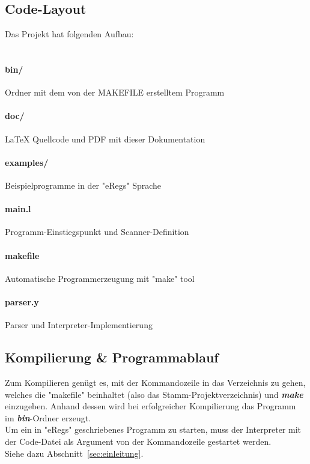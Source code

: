 \documentclass{article}
\begin{document}
\subsection{Code-Layout}
\label{sec:codelayout}
Das Projekt hat folgenden Aufbau:\\
\\
\paragraph{bin/}\hspace{4em}Ordner mit dem von der MAKEFILE erstelltem Programm
\paragraph{doc/}\hspace{4em}LaTeX Quellcode und PDF mit dieser Dokumentation
\paragraph{examples/}\hspace{1em}Beispielprogramme in der "eRegs" Sprache
\paragraph{main.l}\hspace{3em}Programm-Einstiegspunkt und Scanner-Definition
\paragraph{makefile}\hspace{2em}Automatische Programmerzeugung mit "make" tool
\paragraph{parser.y}\hspace{2em}Parser und Interpreter-Implementierung
\\
\subsection{Kompilierung \& Programmablauf}
\label{sec:programmablauf}
Zum Kompilieren genügt es, mit der Kommandozeile in das Verzeichnis zu gehen, welches die "makefile" beinhaltet (also das Stamm-Projektverzeichnis) und \textit{\textbf{make}} einzugeben. Anhand dessen wird bei erfolgreicher Kompilierung das Programm im \textit{\textbf{bin}}-Ordner erzeugt.\\
Um ein in "eRegs" geschriebenes Programm zu starten, muss der Interpreter mit der Code-Datei als Argument von der Kommandozeile gestartet werden.\\
Siehe dazu Abschnitt~\ref{sec:einleitung}.
\\\\
\end{document}
